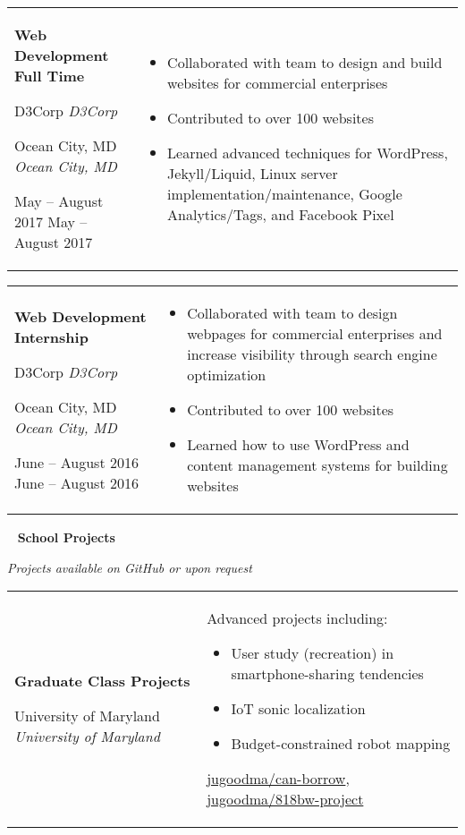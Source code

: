 \documentclass[11pt,letterpaper]{article}
\newcommand{\sect}[1]{
\begin{center}
	\noindent\xrfill[0.7ex]{0.5pt} \mbox{ } {\Large \bf #1} \mbox{ } \xrfill[0.7ex]{0.5pt}
\end{center}
}
\newcommand{\entry}[5]{
	\noindent
	\begin{tabular}{p{2in} p{\dimexpr \linewidth-2\tabcolsep-2.25in}} %
		\noindent \textbf{#1}
		
		\ifx #2  \else \noindent \textit{#2} \fi
		
		\ifx #3  \else \noindent \textit{#3} \fi
		
		\ifx #4  \else \noindent #4 \fi
		&
		#5
	\end{tabular}
	\vspace{0.5cm}
}
\begin{document}
	\entry{Web Development Full Time}{D3Corp}{Ocean City, MD}{May -- August 2017}{
		\vspace{-5mm}
		\begin{itemize}[itemsep=0pt, wide]
			\item Collaborated with team to design and build websites for commercial enterprises
			\item Contributed to over 100 websites
			\item Learned advanced techniques for WordPress, Jekyll/Liquid, Linux server implementation/maintenance, Google Analytics/Tags, and Facebook Pixel
		\end{itemize}
	}
	
	\entry{Web Development Internship}{D3Corp}{Ocean City, MD}{June -- August 2016}{
		\vspace{-5mm}
		\begin{itemize}[itemsep=0pt, wide]
			\item Collaborated with team to design webpages for commercial enterprises and increase visibility through search engine optimization
			\item Contributed to over 100 websites
			\item Learned how to use WordPress and content management systems for building websites
		\end{itemize}
	}
	
	\sect{School Projects}
	
	\vspace*{-0.5cm}
	\begin{center}
		{\small \textit{Projects available on GitHub or upon request}}
	\end{center}
	
	\entry{Graduate Class Projects}{University of Maryland}{}{}{
		Advanced projects including:
		\begin{itemize}[nosep, wide]
			\item User study (recreation) in smartphone-sharing tendencies
			\item IoT sonic localization
			\item Budget-constrained robot mapping
		\end{itemize}
		
		\href{https://github.com/jugoodma/can-borrow}{jugoodma/can-borrow},
		\href{https://github.com/jugoodma/818bw-project}{jugoodma/818bw-project}
	}
	
\end{document}
